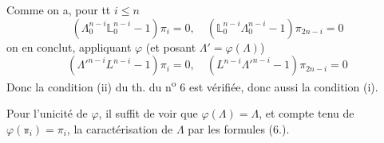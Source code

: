 Comme on a, pour tt $i\le n$
\[
 (\Lambda_0^{n-i}\mathbb L_0^{n-i}-1)\pi_i=0,\quad
 (\mathbb L_0^{n-i}\Lambda_0^{n-i}-1)\pi_{2n-i}=0
\]
on en conclut, appliquant $\varphi$ (et posant $\Lambda'=\varphi(\mathbb{\Lambda})$)
\[
 ({\Lambda'}^{n-i}L^{n-i}-1)\pi_i=0,\quad (L^{n-i}{\Lambda'}^{n-i}-1)\pi_{2n-i}=0
\]
Donc la condition (ii) du th. du n\textsuperscript{o} 6 est vérifiée, donc aussi la condition (i).

Pour l'unicité de $\varphi$,   il suffit de voir que $\varphi(\mathbb{\Lambda})=\Lambda$, et   compte tenu de $\varphi(\mathbb{\pi}_i)=\pi_i$,    la caractérisation  de $\Lambda$  par les formules (6.).
